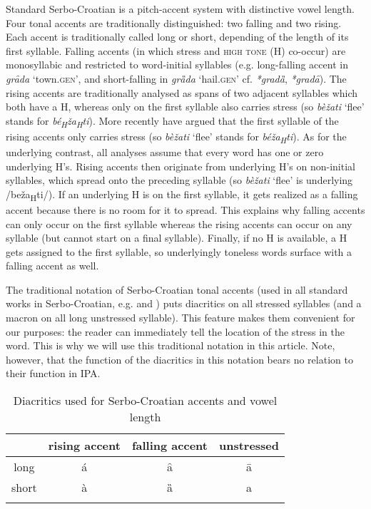 \documentclass[output=paper,modfonts,nonflat
]{langsci/langscibook}
\begin{document}
Standard Serbo-Croatian is a pitch-accent system with distinctive vowel length. Four tonal accents are traditionally distinguished: two falling and two rising. Each accent is traditionally called long or short, depending of the length of its first syllable. Falling accents (in which stress and \textsc{high tone} (H) co-occur) are monosyllabic and restricted to word-initial syllables (e.g. long-falling accent in \textit{grȃda} `town.\textsc{gen}', and short-falling in \textit{grȁda} `hail.\textsc{gen}' cf. \textit{*gradȁ}, \textit{*gradȃ}). The rising accents are traditionally analysed as spans of two adjacent syllables which both have a H, whereas only on the first syllable also carries stress (so \textit{bèžati} `flee' stands for \textit{bé\textsubscript{H}ža\textsubscript{H}ti}). More recently \citet{Zsiga-Zec2013} have argued that the first syllable of the rising accents only carries stress (so \textit{bèžati} `flee' stands for \textit{béža\textsubscript{H}ti}). As for the underlying contrast, all analyses assume that every word has one or zero underlying H's. Rising accents then originate from underlying H's on non-initial syllables, which spread onto the preceding syllable (so \textit{bèžati} `flee' is underlying /beža\textsubscript{H}ti/). If an underlying H is on the first syllable, it gets realized as a falling accent because there is no room for it to spread. This explains why falling accents can only occur on the first syllable whereas the rising accents can occur on any syllable (but cannot start on a final syllable). Finally, if no H is available, a H gets assigned to the first syllable, so underlyingly toneless words surface with a falling accent as well. 

The traditional notation of Serbo-Croatian tonal accents (used in all standard works in Serbo-Croatian, e.g. \citealt{Stevanovic1979} and \citealt{Klaic2013}) puts diacritics on all stressed syllables (and a macron on all long unstressed syllable). This feature makes them convenient for our purposes: the reader can immediately tell the location of the stress in the word. This is why we will use this traditional notation in this article. Note, however, that the function of the diacritics in this notation bears no relation to their function in IPA. 

\begin{table}
\caption{Diacritics used for Serbo-Croatian accents and vowel length}
\label{tab:kager:1}
 \begin{tabular}{ c  c  c c  }
\lsptoprule & rising accent & falling accent & unstressed \\ %
  \midrule
  long  &   á  &    ȃ  &    ā\\
  short  &  à &  ȁ &   a\\
 \lspbottomrule
 \end{tabular}
\end{table}
\end{document}
